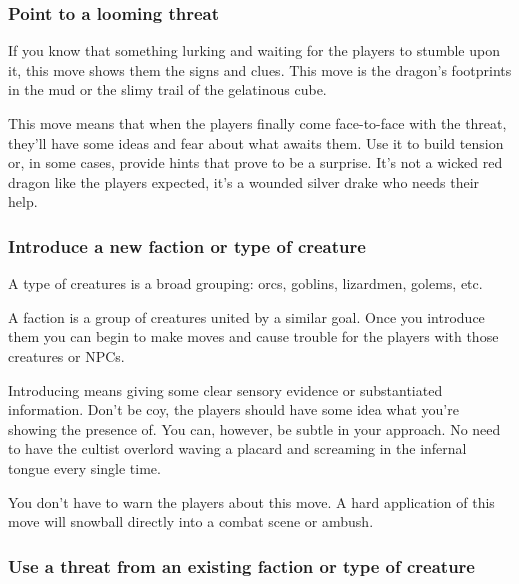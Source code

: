  
\subsubsection{Point to a looming threat}    
 

If you know that something lurking and waiting for the players to stumble upon it, this move shows them the signs and clues. This move is the dragon's footprints in the mud or the slimy trail of the gelatinous cube.

 

This move means that when the players finally come face-to-face with the threat, they'll have some ideas and fear about what awaits them. Use it to build tension or, in some cases, provide hints that prove to be a surprise. It's not a wicked red dragon like the players expected, it's a wounded silver drake who needs their help.

 
\subsubsection{Introduce a new faction or type of creature}      
 

A type of creatures is a broad grouping: orcs, goblins, lizardmen, golems, etc.

 

A faction is a group of creatures united by a similar goal. Once you introduce them you can begin to make moves and cause trouble for the players with those creatures or NPCs.

 

Introducing means giving some clear sensory evidence or substantiated information. Don't be coy, the players should have some idea what you're showing the presence of. You can, however, be subtle in your approach. No need to have the cultist overlord waving a placard and screaming in the infernal tongue every single time.

 

You don't have to warn the players about this move. A hard application of this move will snowball directly into a combat scene or ambush.

 
\subsubsection{Use a threat from an existing faction or type of creature}      
 

